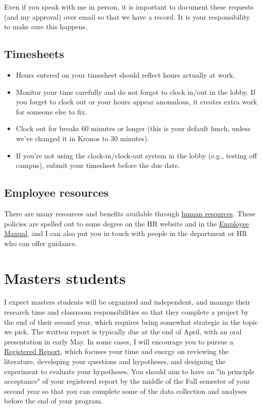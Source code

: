 \documentclass[letterpaper,12pt,oneside]{memoir}
\begin{document}
\begin{shaded}
\noindent Even if you speak with me in person, it is important to document these requests (and my approval) over email so that we have a record. It is your responsibility to make sure this happens.
\end{shaded}

\subsection{Timesheets}

\begin{itemize}
\item Hours entered on your timesheet should reflect hours actually at work.
\item Monitor your time carefully and do not forgot to clock in/out in the lobby. If you forget to clock out or your hours appear anomalous, it creates extra work for someone else to fix. 
\item Clock out for breaks 60 minutes or longer (this is your default lunch, unless we've changed it in Kronos to 30 minutes).
\item If you're not using the clock-in/clock-out system in the lobby (e.g., testing off campus), submit your timesheet before the due date.
\end{itemize}


\subsection{Employee resources}

There are many resources and benefits available through \href{https://www.temple.edu/faculty-and-staff/working-temple/human-resources}{human resources}. These policies are spelled out to some degree on the HR website and in the \href{http://www.temple.edu/hr/departments/employeerelations/documents/Employee_Manual_Feb_2016.pdf}{Employee Manual}, and I can also put you in touch with people in the department or HR who can offer guidance.

\section{Masters students}
I expect masters students will be organized and independent, and manage their research time and classroom responsibilities so that they complete a project by the end of their second year, which requires being somewhat strategic in the topic we pick. The written report is typically due at the end of April, with an oral presentation in early May. In some cases, I will encourage you to pursue a \href{https://cos.io/rr/}{Registered Report}, which focuses your time and energy on reviewing the literature, developing your questions and hypotheses, and designing the experiment to evaluate your hypotheses. You should aim to have an "in principle acceptance" of your registered report by the middle of the Fall semester of your second year so that you can complete some of the data collection and analyses before the end of your program.
\end{document}
